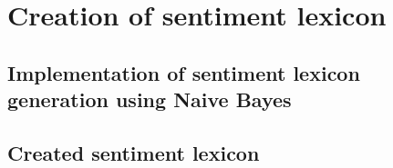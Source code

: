\chapter{Creation of sentiment lexicon}
\section{Implementation of sentiment lexicon generation using Naive Bayes}
\section{Created sentiment lexicon}
